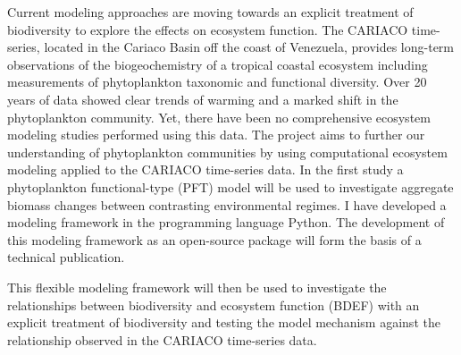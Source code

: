 \begin{titlepage}
Current modeling approaches are moving towards an explicit treatment of biodiversity to explore the effects on ecosystem function. The CARIACO time-series, located in the Cariaco Basin off the coast of Venezuela, provides long-term observations of the biogeochemistry of a tropical coastal ecosystem including measurements of phytoplankton taxonomic and functional diversity. Over  20 years of data showed clear trends of warming and a marked shift in the phytoplankton community. 
Yet, there have been no comprehensive ecosystem modeling studies performed using this data. The project aims to further our understanding of phytoplankton communities by using computational ecosystem modeling applied to the CARIACO time-series data. In the first study a phytoplankton functional-type (PFT) model will be used to investigate aggregate biomass changes between contrasting environmental regimes. 
I have developed a modeling framework in the programming language Python. The development of this modeling framework as an open-source package will form the basis of a technical publication. 

		
This flexible modeling framework will then be used to investigate the relationships between biodiversity and ecosystem function (BDEF) with an explicit treatment of biodiversity and testing the model mechanism against the relationship observed in the CARIACO time-series data. 



  

\end{titlepage}